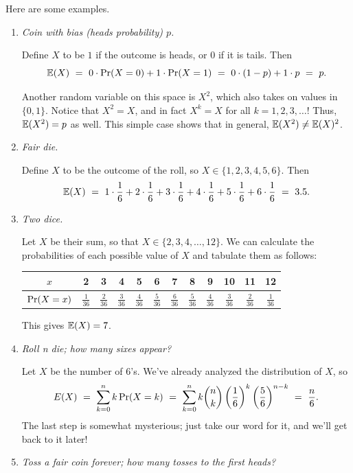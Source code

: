 Here are some examples.
\begin{enumerate}
\item {\it Coin with bias (heads probability) $p$.}

Define $X$ to be $1$ if the outcome is heads, or $0$ if it is tails. Then 
$$ \E(X) 
\ = \ 
0 \cdot \pr(X = 0) + 1 \cdot \pr(X = 1)  
\ = \ 
0 \cdot (1-p) + 1 \cdot p
\ = \ 
p .
$$

Another random variable on this space is $X^2$, which also takes on values in $\{0,1\}$.
Notice that $X^2 = X$, and in fact $X^k = X$ for all $k = 1,2,3,\ldots$! Thus, 
$\mathbb{E}(X^2) = p$ as well. This simple case shows that in general, $\mathbb{E}(X^2) \neq \mathbb{E}(X)^2$.

\item {\it Fair die.}

Define $X$ to be the outcome of the roll, so $X \in \{1,2,3,4,5,6\}$. Then
$$ \E(X) 
\ = \ 
1 \cdot \frac{1}{6} + 2 \cdot \frac{1}{6} + 3 \cdot \frac{1}{6} + 4 \cdot \frac{1}{6}
+ 5 \cdot \frac{1}{6} + 6 \cdot \frac{1}{6} 
\ = \ 
3.5.$$

\item {\it Two dice.}

Let $X$ be their sum, so that $X \in \{2,3,4,\ldots, 12\}$. We can calculate the probabilities
of each possible value of $X$ and tabulate them as follows:

\begin{center}
\begin{tabular}{c|c|c|c|c|c|c|c|c|c|c|c}
$x$          & 2 & 3 & 4 & 5 & 6 & 7 & 8 & 9 & 10 & 11 & 12 \\ \hline
$\mbox{\rm Pr}(X = x)$ & $\frac{1}{36}$ & $\frac{2}{36}$ & $\frac{3}{36}$ & $\frac{4}{36}$ & $\frac{5}{36}$ & $\frac{6}{36}$ & $\frac{5}{36}$ & $\frac{4}{36}$ & $\frac{3}{36}$ & $\frac{2}{36}$ & $\frac{1}{36}$  
\end{tabular}
\end{center}

This gives $\mathbb{E}(X) = 7$.

\item {\it Roll n die; how many sixes appear?}

Let $X$ be the number of $6$'s. We've already analyzed the distribution of $X$, so
$$ E(X) 
\ = \ 
\sum_{k = 0}^n k \, \pr(X = k)
\ = \ 
\sum_{k = 0}^n k {n \choose k} \left(\frac{1}{6} \right)^k \left( \frac{5}{6} \right)^{n-k}
\ = \ 
\frac{n}{6}.
$$
The last step is somewhat mysterious; just take our word for it, and we'll get back to it later!

\item {\it Toss a fair coin forever; how many tosses to the first heads?}


\end{enumerate}
